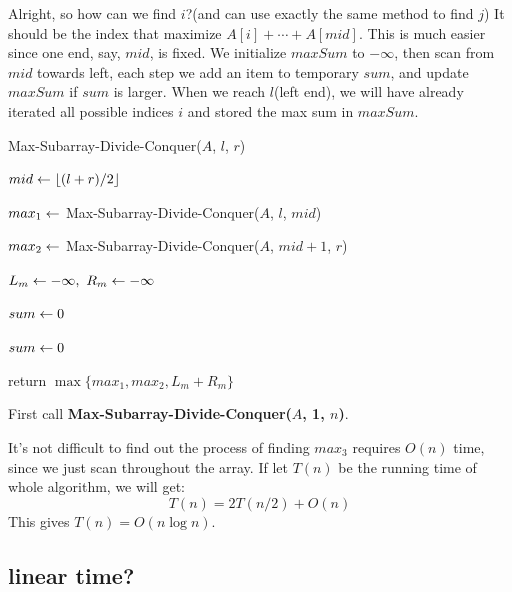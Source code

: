 \begin{spacing}{1.3}
    Alright, so how can we find $i$?(and can use exactly the same 
    method to find $j$)
    It should be the index that maximize $A[i]+\cdots +A[mid]$.
    This is much easier since one end, say, $mid$, is fixed.
    We initialize $maxSum$ to $-\infty$, then scan from $mid$ towards left,
    each step we add an item to temporary $sum$, and update 
    $maxSum$ if $sum$ is larger. When we reach $l$(left end), 
    we will have already iterated all possible indices $i$ and 
    stored the max sum in $maxSum$.
    
    \begin{algorithm}[H]
        \caption{Max-Subarray-Divide-Conquer($A$, $l$, $r$)}


        $mid\leftarrow \lfloor (l+r)/2 \rfloor$

        $max_1\leftarrow $ Max-Subarray-Divide-Conquer($A$, $l$, $mid$)

        $max_2\leftarrow $ Max-Subarray-Divide-Conquer($A$, $mid+1$, $r$)


        $L_m\leftarrow -\infty,\ R_m\leftarrow -\infty$

        $sum\leftarrow 0$


        $sum\leftarrow 0$


        return $\max \{ max_1, max_2, L_m+R_m \}$
    \end{algorithm}

    First call {\bf Max-Subarray-Divide-Conquer($A$, 1, $n$)}.

    It's not difficult to find out the process of finding $max_3$
    requires $O(n)$ time, since we just scan throughout the array.
    If let $T(n)$ be the running time of whole algorithm, 
    we will get:
    $$T(n)=2T(n/2)+O(n)$$
    This gives $T(n)=O(n\log n)$.

    \subsection{linear time?}


\end{spacing}
